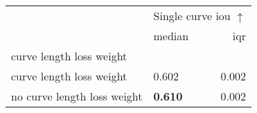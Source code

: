 \begin{tabular}{llr}
\toprule
 & \multicolumn{2}{c}{Single curve \acrshort{iou} $\uparrow$} \\
 & median & \acrshort{iqr} \\
curve length loss weight &  &  \\
\midrule
curve length loss weight & 0.602 & 0.002 \\
no curve length loss weight & \textbf{0.610} & 0.002 \\
\bottomrule
\end{tabular}
